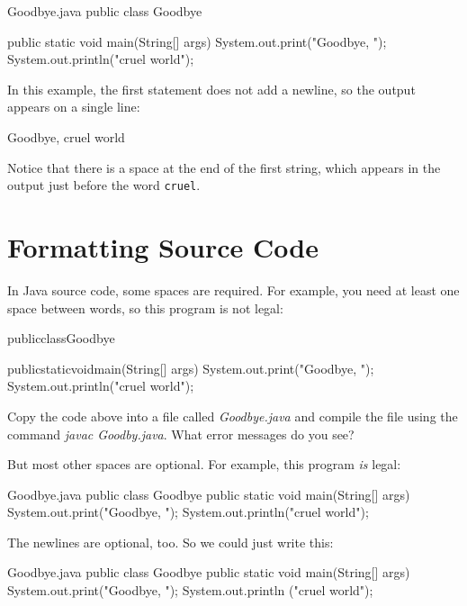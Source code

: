 \begin{trinket}[235]{Goodbye.java}
public class Goodbye {

    public static void main(String[] args) {
        System.out.print("Goodbye, ");
        System.out.println("cruel world");
    }
}
\end{trinket}

\label{goodbye}

In this example, the first statement does not add a newline, so the output appears on a single line:

\begin{stdout}
Goodbye, cruel world
\end{stdout}

Notice that there is a space at the end of the first string, which appears in the output just before the word {\tt cruel}.


\section{Formatting Source Code}
\label{formatting}

In Java source code, some spaces are required.
For example, you need at least one space between words, so this program is not legal:

\begin{code}
publicclassGoodbye{

    publicstaticvoidmain(String[] args) {
        System.out.print("Goodbye, ");
        System.out.println("cruel world");
    }
}
\end{code}

Copy the code above into a file called {\it Goodbye.java} and compile the file 
using the command {\it javac Goodby.java}. What error messages do you see?

But most other spaces are optional.
For example, this program {\em is} legal:

\begin{trinket}[220]{Goodbye.java}
public class Goodbye {
public static void main(String[] args) {
System.out.print("Goodbye, ");
System.out.println("cruel world");
}
}
\end{trinket}

The newlines are optional, too.
So we could just write this:

\begin{trinket}[175]{Goodbye.java}
public class Goodbye { public static void main(String[] args)
{ System.out.print("Goodbye, "); System.out.println
("cruel world");}}
\end{trinket}


